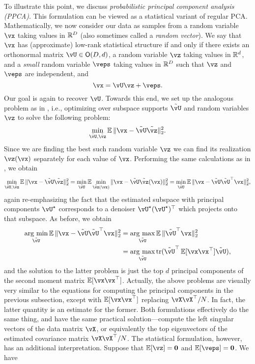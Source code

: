 \documentclass[../../book-main.tex]{subfiles}
\begin{document}
To illustrate this point, we discuss \textit{probabilistic principal component analysis (PPCA).} This formulation can be viewed as a statistical variant of regular PCA. Mathematically, we now consider our data as samples from a random variable \(\vx\) taking values in \(\mathbb{R}^{D}\) (also sometimes called a \textit{random vector}). We say that \(\vx\) has (approximate) low-rank statistical structure if and only if there exists an orthonormal matrix \(\vU \in \O(D, d)\), a random variable \(\vz\) taking values in \(\mathbb{R}^{d}\), and a \textit{small} random variable \(\veps\) taking values in \(\mathbb{R}^{D}\) such that \(\vz\) and \(\veps\) are independent, and
\begin{equation}
    \vx = \vU\vz + \veps.
\end{equation}
Our goal is again to recover \(\vU\). Towards this end, we set up the analogous problem as in , i.e., optimizing over subspace supports \(\tilde{\vU}\) and random variables \(\vz\) to solve the following problem:
\begin{equation}
    \min_{\tilde{\vU}, \tilde{\vz}}\Ex\norm{\vx - \tilde{\vU}\tilde{\vz}}_{2}^{2}.
\end{equation}
Since we are finding the best such random variable \(\vz\) we can find its realization \(\vz(\vx)\) separately for each value of \(\vx\). Performing the same calculations as in , we obtain %
\begin{equation}\label{eq:ppca_denoising}
    \min_{\tilde{\vU}, \tilde{\vz}}\Ex\norm{\vx - \tilde{\vU}\tilde{\vz}}_{2}^{2} = \min_{\tilde{\vU}}\Ex\min_{\tilde{\vz}(\vx)}\norm{\vx - \tilde{\vU}\tilde{\vz}(\vx)}_{2}^{2} = \min_{\tilde{\vU}}\Ex\norm{\vx - \tilde{\vU}\tilde{\vU}^{\top}\vx}_{2}^{2},
\end{equation}
again re-emphasizing the fact that the estimated subspace with principal components \(\vU^{\star}\) corresponds to a denoiser \(\vU^{\star}(\vU^{\star})^{\top}\) which projects onto that subspace. As before, we obtain 
\begin{align}\label{eq:PPCA}
    \argmin_{\tilde{\vU}}\Ex\norm{\vx - \tilde{\vU}\tilde{\vU}^{\top}\vx}_{2}^{2} 
    &= \argmax_{\tilde{\vU}}\Ex\norm{\tilde{\vU}^{\top}\vx}_{2}^{2} \\
    &= \argmax_{\tilde{\vU}}\tr(\tilde{\vU}^{\top}\Ex[\vx\vx^{\top}]\tilde{\vU}),
\end{align}
and the solution to the latter problem is just the top \(d\) principal components of the second moment matrix \(\Ex[\vx\vx^{\top}]\). Actually, the above problems are visually very similar to the equations for computing the principal components in the previous subsection, except with \(\Ex[\vx\vx^{\top}]\) replacing \(\vX\vX^{\top}/N\). In fact, the latter quantity is an estimate for the former. Both formulations effectively do the same thing, and have the same practical solution---compute the left singular vectors of the data matrix \(\vX\), or equivalently the top eigenvectors of the estimated covariance matrix \(\vX\vX^{\top}/N\). The statistical formulation, however, has an additional interpretation. Suppose that \(\Ex[\vz] = \vzero\) and \(\Ex[\veps] = \vzero\). We have
\end{document}

